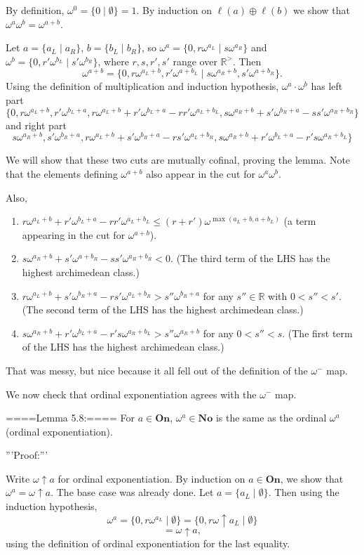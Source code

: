 By definition, $\omega^0=\{0\mid \emptyset\}=1$. By induction on $\ell(a)\oplus \ell(b)$ we show that $\omega^a\omega^b=\omega^{a+b}$.

Let $a=\{a_L\mid a_R\}$, $b=\{b_L\mid b_R\}$, so $\omega^a=\{0,r\omega^{a_L}\mid s\omega^{a_R}\}$ and $\omega^b=\{0,r'\omega^{b_L}\mid s'\omega^{b_R}\}$, where $r,s,r',s'$ range over $\mathbb{R}^>$. Then 
$$\omega^{a+b}=\{0,r\omega^{a_L+b},r'\omega^{a+b_L}\mid s\omega^{a_R+b}, s'\omega^{a+b_R}\}.$$
Using the definition of multiplication and induction hypothesis,
$\omega^a\cdot\omega^b$ has left part
$$\{0,r\omega^{a_L+b}, r'\omega^{b_L+a},r\omega^{a_L+b}+r'\omega^{b_L+a}-rr'\omega^{a_L+b_L},s\omega^{a_R+b}+s'\omega^{b_R+a}-ss'\omega^{a_R+b_R}\}$$
and right part
$$s\omega^{a_R+b},s'\omega^{b_R+a},r\omega^{a_L+b}+s'\omega^{b_R+a}-rs'\omega^{a_L+b_R},s\omega^{a_R+b}+r'\omega^{b_L+a}-r's\omega^{a_R+b_L}\}$$

We will show that these two cuts are mutually cofinal, proving the lemma. Note that the elements defining $\omega^{a+b}$ also appear in the cut for $\omega^a\omega^b$.

Also, 
\begin{enumerate}
  \item  $r\omega^{a_L+b}+r'\omega^{b_L+a}-rr'\omega^{a_L+b_L}\le (r+r')\omega^{\max(a_L+b,a+b_L)}$ (a term appearing in the cut for $\omega^{a+b}$).
  \item  $s\omega^{a_R+b}+s'\omega^{a+b_R}-ss'\omega^{a_R+b_R}<0$. (The third term  of the LHS has the highest archimedean class.)
  \item  $r\omega^{a_L+b}+s'\omega^{b_R+a}-rs'\omega^{a_L+b_R}>s''\omega^{b_R+a}$ for any $s''\in\mathbb{R}$ with $0<s''<s'$. (The second term of the LHS has the highest archimedean class.)
  \item  $s\omega^{a_R+b}+r'\omega^{b_L+a}-r's\omega^{a_R+b_L}>s''\omega^{a_R+b}$ for any $0<s''<s$. (The first term of the LHS has the highest archimedean class.)
\end{enumerate}
That was messy, but nice because it all fell out of the definition of the $\omega^-$ map.

We now check that ordinal exponentiation agrees with the $\omega^-$ map.

====Lemma 5.8:====
For $a\in\mathbf{On}$, $\omega^a\in\mathbf{No}$ is the same as the ordinal $\omega^a$ (ordinal exponentiation).

'''Proof:'''

Write $\omega\uparrow a$ for ordinal exponentiation. By induction on $a\in \mathbf{On}$, we show that $\omega^a=\omega\uparrow a$. The base case was already done. Let $a=\{a_L\mid \emptyset\}$. Then using the induction hypothesis,
$$\omega^a=\{0,r\omega^{a_L}\mid \emptyset\}=\{0,r\omega\uparrow a_L\mid\emptyset\}$$
$$=\omega\uparrow a,$$
using the definition of ordinal exponentiation for the last equality.

